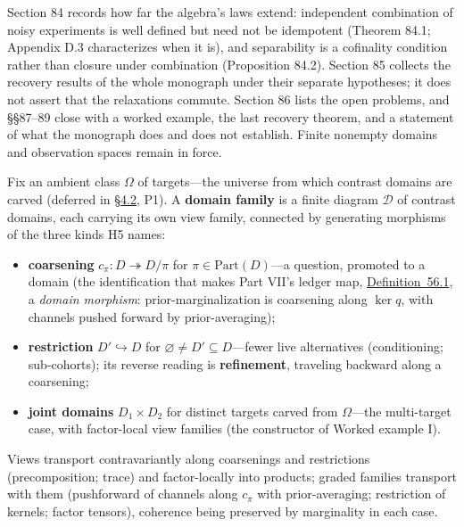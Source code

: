 Section 84 records how far the algebra's laws extend: independent combination of noisy experiments is well defined but need not be idempotent (Theorem 84.1; Appendix D.3 characterizes when it is), and separability is a cofinality condition rather than closure under combination (Proposition 84.2). Section 85 collects the recovery results of the whole monograph under their separate hypotheses; it does not assert that the relaxations commute. Section 86 lists the open problems, and §§87--89 close with a worked example, the last recovery theorem, and a statement of what the monograph does and does not establish. Finite nonempty domains and observation spaces remain in force.


\begin{thmdef}

Fix an ambient class \(\Omega\) of targets---\hspace{0pt}the universe from which contrast domains are carved (deferred in \hyperlink{sec:4.2}{§4.2}, P1). A \textbf{domain family} is a finite diagram \(\mathcal{D}\) of contrast domains, each carrying its own view family, connected by generating morphisms of the three kinds H5 names:

\begin{itemize}
\tightlist
\item
  \textbf{coarsening} \(c_\pi : D \twoheadrightarrow D/\pi\) for \(\pi \in \mathrm{Part}(D)\)---\hspace{0pt}a question, promoted to a domain (the identification that makes Part VII's ledger map, \hyperlink{stmt:56.1}{Definition~56.1}, a \emph{domain morphism}: prior-marginalization is coarsening along \(\ker q\), with channels pushed forward by prior-averaging);
\item
  \textbf{restriction} \(D' \hookrightarrow D\) for \(\varnothing\ne D'\subseteq D\)---\hspace{0pt}fewer live alternatives (conditioning; sub-cohorts); its reverse reading is \textbf{refinement}, traveling backward along a coarsening;
\item
  \textbf{joint domains} \(D_1 \times D_2\) for distinct targets carved from \(\Omega\)---\hspace{0pt}the multi-target case, with factor-local view families (the constructor of Worked example I).
\end{itemize}

Views transport contravariantly along coarsenings and restrictions (precomposition; trace) and factor-locally into products; graded families transport with them (pushforward of channels along \(c_\pi\) with prior-averaging; restriction of kernels; factor tensors), coherence being preserved by marginality in each case.
\end{thmdef}

